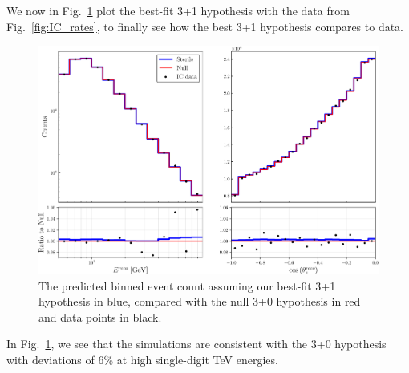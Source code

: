 We now in Fig.~\ref{fig:final_rate_plot} plot the best-fit 3+1 hypothesis with the data from Fig.~\ref{fig:IC_rates}, to finally see how the best 
3+1 hypothesis compares to data.
\begin{figure}
    \centering
    \includegraphics[width=1\textwidth]{figures/final_rate_plot.pdf}
    \caption{The predicted binned event count assuming our best-fit 3+1 hypothesis in blue, compared with the 
    null 3+0 hypothesis in red and data points in black.}\label{fig:final_rate_plot}
\end{figure}

In Fig.~\ref{fig:final_rate_plot}, we see that the simulations are consistent with the 3+0 hypothesis with deviations of 6\% at high single-digit 
\si{\TeV} energies.

